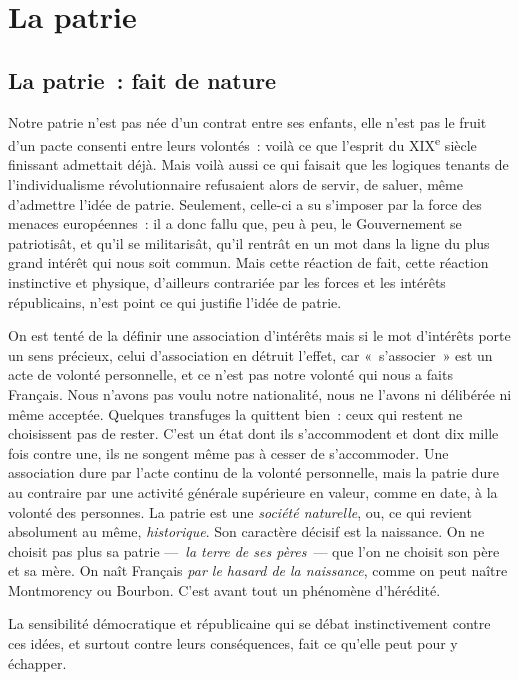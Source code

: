 \documentclass[french,twoside]{book} %
\newcommand{\astermono}{\medskip\centerline{\color{rubric}\large\selectfont{\syms ✻}}\medskip\par}%
\begin{document}
\section[{La patrie}]{La patrie}
\subsection[{La patrie : fait de nature}]{La patrie : fait de nature}
\noindent Notre patrie n’est pas née d’un contrat entre ses enfants, elle n’est pas le fruit d’un pacte consenti entre leurs volontés : voilà ce que l’esprit du XIX\textsuperscript{e} siècle finissant admettait déjà. Mais voilà aussi ce qui faisait que les logiques tenants de l’individualisme révolutionnaire refusaient alors de servir, de saluer, même d’admettre l’idée de patrie. Seulement, celle-ci a su s’imposer par la force des menaces européennes : il a donc fallu que, peu à peu, le Gouvernement se patriotisât, et qu’il se militarisât, qu’il rentrât en un mot dans la ligne du plus grand intérêt qui nous soit commun. Mais cette réaction de fait, cette réaction instinctive et physique, d’ailleurs contrariée par les forces et les intérêts républicains, n’est point ce qui justifie l’idée de patrie.\par

\astermono

\noindent On est tenté de la définir une association d’intérêts mais si le mot d’intérêts porte un sens précieux, celui d’association en détruit l’effet, car « s’associer » est un acte de volonté personnelle, et ce n’est pas notre volonté qui nous a faits Français. Nous n’avons pas voulu notre nationalité, nous ne l’avons ni délibérée ni même acceptée. Quelques transfuges la quittent bien : ceux qui restent ne choisissent pas de rester. C’est un état dont ils s’accommodent et dont dix mille fois contre une, ils ne songent même pas à cesser de s’accommoder. Une association dure par l’acte continu de la volonté personnelle, mais la patrie dure au contraire par une activité générale supérieure en valeur, comme en date, à la volonté des personnes. La patrie est une \emph{société naturelle}, ou, ce qui revient absolument au même, \emph{historique}. Son caractère décisif est la naissance. On ne choisit pas plus sa patrie — \emph{la terre de ses pères} — que l’on ne choisit son père et sa mère. On naît Français \emph{par le hasard de la naissance}, comme on peut naître Montmorency ou Bourbon. C’est avant tout un phénomène d’hérédité.\par
La sensibilité démocratique et républicaine qui se débat instinctivement contre ces idées, et surtout contre leurs conséquences, fait ce qu’elle peut pour y échapper.\par
\end{document}
